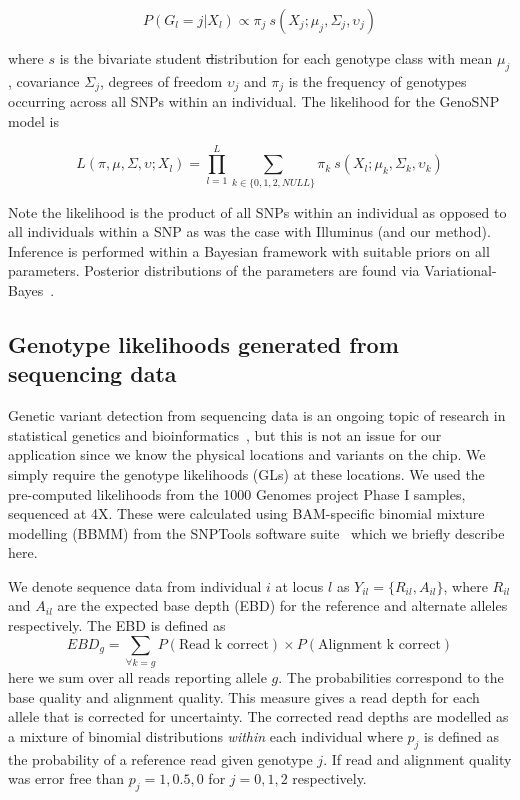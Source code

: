 $$P(G_l=j|X_l) \propto \pi_j~s(X_j;\mu_j,\Sigma_j,\upsilon_j)$$ 

where $s$ is the bivariate student \st distribution for each genotype class with mean $\mu_j$, covariance $\Sigma_j$, degrees of freedom $\upsilon_j$ and $\pi_j$ is the frequency of genotypes occurring across all SNPs within an individual.  The likelihood for the GenoSNP model is 

$$L(\pi,\mu,\Sigma,\upsilon;X_l) = \prod_{l=1}^L \sum_{k\in\{0,1,2,NULL\}} \pi_k~s(X_l;\mu_k,\Sigma_k,\upsilon_k)$$

Note the likelihood is the product of all SNPs within an individual as opposed to all individuals within a SNP as was the case with Illuminus (and our method).  Inference is performed within a Bayesian framework with suitable priors on all parameters. Posterior distributions of the parameters are found via Variational-Bayes~\citep{archambeau2007robust}.  

\subsection{Genotype likelihoods generated from sequencing data}
Genetic variant detection from sequencing data is an ongoing topic of research in statistical genetics and bioinformatics~\citep{nielsen2011genotype}, but this is not an issue for our application since we know the physical locations and variants on the chip.  We simply require the genotype likelihoods (GLs) at these locations.  We used the pre-computed likelihoods from the 1000 Genomes project Phase I samples, sequenced at 4X.  These were calculated using BAM-specific binomial mixture modelling (BBMM) from the SNPTools software suite~\citep{wang2013integrative} which we briefly describe here.  

We denote sequence data from individual $i$ at locus $l$ as $Y_{il} = \{R_{il},A_{il} \}$, where $R_{il}$ and $A_{il}$ are the expected base depth (EBD) for the reference and alternate alleles respectively. The EBD is defined as
$$EBD_g = \sum_{\forall k=g} P(\textrm{Read k correct})\times P(\textrm{Alignment k correct})$$
here we sum over all reads reporting allele $g$. The probabilities correspond to the base quality and alignment quality.  This measure gives a read depth for each allele that is corrected for uncertainty. The corrected read depths are modelled as a mixture of binomial distributions \emph{within} each individual where $p_j$ is defined as the probability of a reference read given genotype $j$. If read and alignment quality was error free than $p_j = 1,0.5,0$ for $j=0,1,2$ respectively.

